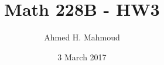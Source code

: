 \documentclass[12pt]{article}
\begin{document}
\title{Math 228B - HW3}
\author{Ahmed H. Mahmoud}
\date{3 March 2017} 

\maketitle

\newcommand{\cn}{Crank-Nicolson}



\newpage



\newpage




\end{document}
